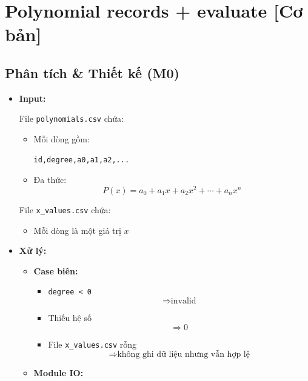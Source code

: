 \section{Polynomial records + evaluate [Cơ bản]}
\subsection{Phân tích \& Thiết kế (M0)}

\begin{itemize}

    \item \textbf{Input:}

    File \texttt{polynomials.csv} chứa:

    \begin{itemize}
        \item Mỗi dòng gồm:
\begin{lstlisting}
id,degree,a0,a1,a2,...
\end{lstlisting}
        \item Đa thức:
        \[
            P(x)=a_0+a_1x+a_2x^2+\cdots+a_nx^n
        \]
    \end{itemize}

    File \texttt{x\_values.csv} chứa:

    \begin{itemize}
        \item Mỗi dòng là một giá trị \(x\)
    \end{itemize}

    \item \textbf{Xử lý:}

    \begin{itemize}

        \item \textbf{Case biên:}

        \begin{itemize}
            \item \texttt{degree < 0}
            \[
                \Rightarrow \text{invalid}
            \]

            \item Thiếu hệ số
            \[
                \Rightarrow 0
            \]

            \item File \texttt{x\_values.csv} rỗng
            \[
                \Rightarrow \text{không ghi dữ liệu nhưng vẫn hợp lệ}
            \]
        \end{itemize}

        \item \textbf{Module IO:}


\end{itemize}
\end{itemize}
